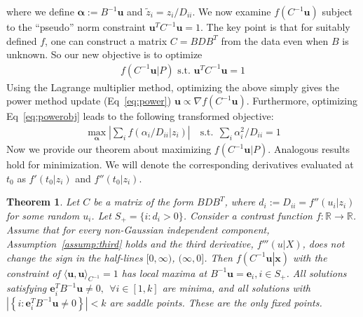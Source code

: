 \documentclass[letterpaper]{article}
\newtheorem{theorem}{Theorem}
\newcommand{\ba}[1]{\begin{align}#1\end{align}}
\newcommand{\bas}[1]{\begin{align*}#1\end{align*}}
\newcommand{\bu}{\pmb{u}}
\newcommand{\balpha}{\pmb{\alpha}}
\newcommand{\bx}{\pmb{x}}
\newcommand{\be}{\pmb{e}}
\newcommand{\bz}{\pmb{z}}
\newcommand{\rd}{\color{red}}
\newcommand{\E}{\mathbb{E}}
\newcommand{\bb}[1]{\left(#1\right)}
\newcommand{\bbb}[1]{\left[#1\right]}
\begin{document}
where we define $\balpha := B^{-1}\bu$ and $\tilde{z}_i=z_i/D_{ii}$. 
We now examine $f(C^{-1}\bu)$ subject to the ``pseudo'' norm constraint $\bu^{T}C^{-1}\bu=1$. The key point is that for suitably defined $f$, one can construct a matrix $C=BDB^T$ from the data even when $B$ is unknown. So our new objective is to optimize
\bas{
 f\bb{C^{-1}\bu|P} \text{ s.t. } \bu^TC^{-1}\bu=1
}
 Using the Lagrange multiplier method, optimizing the above simply gives the power method update (Eq~\ref{eq:power})
$\bu\propto\nabla f(C^{-1}\bu)$. Furthermore, optimizing Eq~\ref{eq:powerobj} leads to the following transformed objective: 
\ba{
\max_{\balpha} \left|\sum_i f\bb{\left.\alpha_i/D_{ii}\right|z_i}\right|\quad\text{s.t.}\ \ \sum_i \alpha_i^2/D_{ii}=1 \label{eq:transformed_objective}
}
Now we provide our theorem about maximizing $f(C^{-1}\bu|P)$. Analogous results hold for minimization. We will denote the corresponding derivatives evaluated at $t_{0}$ as $f'(t_0|z_i)$ and $f''(t_0|z_i)$. 
\begin{theorem}
\label{theorem:global_convergence} %
Let $C$ be a matrix of the form $BDB^T$, where $d_{i} := D_{ii} = f''(u_i|z_i)$ for some random  $u_i$. Let $S_+=\{i:d_i>0\}$. Consider a contrast function $f:\mathbb{R}\rightarrow \mathbb{R}$. Assume that for every non-Gaussian independent component, Assumption~\ref{assump:third} holds and the third derivative, $f'''(u|X)$, does not change the sign in the half-lines $[0,\infty)$, $(\infty,0]$. Then $f\bb{\left.C^{-1}\bu\right|\bx}$ with the constraint of $\langle\bu,\bu\rangle_{C^{-1}}=1$ has local maxima at $B^{-1}\bu=\be_i,i\in S_+$. %
 All solutions satisfying $\be_i^T B^{-1}\bu\neq 0,\ \ \forall i \in [1,k]$ are minima, and all solutions with $|\left\{i : \be_i^TB^{-1}\bu\neq 0\right\}| < k$ are saddle points. These are the only fixed points.
\end{theorem}
\end{document}
